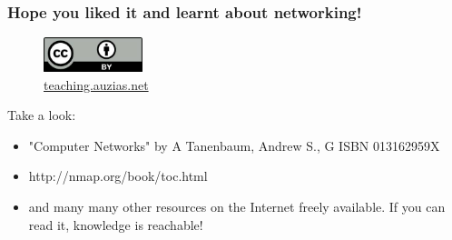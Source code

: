 \documentclass[]{beamer}
\begin{document}
\begin{frame}
    \frametitle{Hope you liked it and learnt about networking!}
  \begin{figure}[p]
      \centering
      \includegraphics[height=1cm]{./imgs/cc40.jpg}
      \caption{\color{blue}\href{http://teaching.auzias.net}{teaching.auzias.net}}
    \label{fig:cc40}
  \end{figure}
  \begin{block}{Take a look:}
    \begin{itemize}
      \item "Computer Networks" by A Tanenbaum, Andrew S., G ISBN 013162959X
      \item http://nmap.org/book/toc.html
      \item and many many other resources on the Internet freely available. If you can read it, knowledge is reachable!
    \end{itemize}
  \end{block}
\end{frame}
\end{document}
